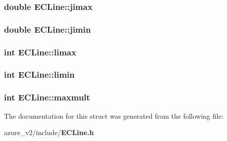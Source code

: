 \subsubsection{\setlength{\rightskip}{0pt plus 5cm}double \bf{ECLine::jimax}}\label{structECLine_e1d99944cc814f3909c14987bf6d0f4d}


\subsubsection{\setlength{\rightskip}{0pt plus 5cm}double \bf{ECLine::jimin}}\label{structECLine_ff18fbd136075381af8ab1573548049c}


\subsubsection{\setlength{\rightskip}{0pt plus 5cm}int \bf{ECLine::limax}}\label{structECLine_d90de270e5acffe518d42274a309d6a1}


\subsubsection{\setlength{\rightskip}{0pt plus 5cm}int \bf{ECLine::limin}}\label{structECLine_512da777f217d64ba05d7e96a432cf49}


\subsubsection{\setlength{\rightskip}{0pt plus 5cm}int \bf{ECLine::maxmult}}\label{structECLine_d2bc7aa72380e0cdafd663dbc8913b19}




The documentation for this struct was generated from the following file:\begin{CompactItemize}
\item 
azure\_\-v2/include/\bf{ECLine.h}\end{CompactItemize}
